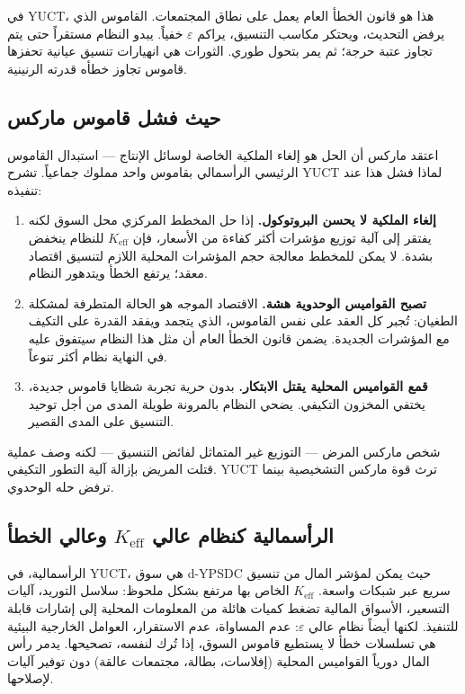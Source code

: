 \documentclass[12pt,a4paper]{article}
\newcommand{\Keff}{K_{\mathrm{eff}}}
\begin{document}
	في YUCT، هذا هو قانون الخطأ العام يعمل على نطاق المجتمعات. القاموس الذي يرفض التحديث، ويحتكر مكاسب التنسيق، يراكم \(\varepsilon\) خفياً. يبدو النظام مستقراً حتى يتم تجاوز عتبة حرجة؛ ثم يمر بتحول طوري. الثورات هي انهيارات تنسيق عيانية تحفزها قاموس تجاوز خطأه قدرته الرنينية.
	
	\subsection{حيث فشل قاموس ماركس}
	
	اعتقد ماركس أن الحل هو إلغاء الملكية الخاصة لوسائل الإنتاج — استبدال القاموس الرئيسي الرأسمالي بقاموس واحد مملوك جماعياً. تشرح YUCT لماذا فشل هذا عند تنفيذه:
	
	\begin{enumerate}[leftmargin=*]
		\item \textbf{إلغاء الملكية لا يحسن البروتوكول.} إذا حل المخطط المركزي محل السوق لكنه يفتقر إلى آلية توزيع مؤشرات أكثر كفاءة من الأسعار، فإن \(\Keff\) للنظام ينخفض بشدة. لا يمكن للمخطط معالجة حجم المؤشرات المحلية اللازم لتنسيق اقتصاد معقد؛ يرتفع الخطأ ويتدهور النظام.
		\item \textbf{تصبح القواميس الوحدوية هشة.} الاقتصاد الموجه هو الحالة المتطرفة لمشكلة الطغيان: تُجبر كل العقد على نفس القاموس، الذي يتجمد ويفقد القدرة على التكيف مع المؤشرات الجديدة. يضمن قانون الخطأ العام أن مثل هذا النظام سيتفوق عليه في النهاية نظام أكثر تنوعاً.
		\item \textbf{قمع القواميس المحلية يقتل الابتكار.} بدون حرية تجربة شظايا قاموس جديدة، يختفي المخزون التكيفي. يضحي النظام بالمرونة طويلة المدى من أجل توحيد التنسيق على المدى القصير.
	\end{enumerate}
	
	شخص ماركس المرض — التوزيع غير المتماثل لفائض التنسيق — لكنه وصف عملية قتلت المريض بإزالة آلية التطور التكيفي. YUCT ترث قوة ماركس التشخيصية بينما ترفض حله الوحدوي.
	
	\subsection{الرأسمالية كنظام عالي \(\Keff\) وعالي الخطأ}
	
	الرأسمالية، في YUCT، هي سوق d-YPSDC حيث يمكن لمؤشر المال من تنسيق سريع عبر شبكات واسعة. \(\Keff\) الخاص بها مرتفع بشكل ملحوظ: سلاسل التوريد، آليات التسعير، الأسواق المالية تضغط كميات هائلة من المعلومات المحلية إلى إشارات قابلة للتنفيذ. لكنها أيضاً نظام عالي \(\varepsilon\): عدم المساواة، عدم الاستقرار، العوامل الخارجية البيئية هي تسلسلات خطأ لا يستطيع قاموس السوق، إذا تُرك لنفسه، تصحيحها. يدمر رأس المال دورياً القواميس المحلية (إفلاسات، بطالة، مجتمعات عالقة) دون توفير آليات لإصلاحها.
	
\end{document}
